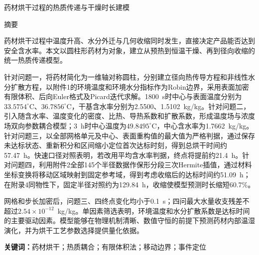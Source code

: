 \documentclass[UTF8,a4paper,zihao=-4,fontset=fandol]{ctexart}
\newcommand{\papertitle}{药材烘干过程的热质传递与干燥时长建模}
\newcommand{\blankcontent}{\par\noindent\strut\par}
\begin{document}

\begin{center}
  {\heiti{}\strut\papertitle\par}
  \vspace{1em}
  {\heiti{}摘要\par}
\end{center}
\hspace*{2em}药材烘干过程中温度升高、水分外迁与几何收缩同时发生，直接决定产品能否达到安全含水率。本文以圆柱形药材为对象，建立从预热到恒温干燥、再到径向收缩的统一热质传递模型。

针对问题一，将药材简化为一维轴对称圆柱，分别建立径向热传导方程和非线性水分扩散方程，以附件1的环境温度和环境水分指标作为Robin边界，采用表面加密有限体积、后向Euler格式及Picard迭代求解。1800~s时中心与表面温度分别为$33.5754^\circ\mathrm C$、$36.7856^\circ\mathrm C$，干基含水率分别为2.5500、1.5102~kg/kg。针对问题二，引入随含水率、温度变化的密度、比热、导热系数和扩散系数，形成温度场与浓度场双向参数耦合模型；3~h时中心温度为$49.8495^\circ\mathrm C$，中心含水率为1.7662~kg/kg。针对问题三，以全部网格单元及中心、表面重构值的最大值为严格判据，通过保存未达标状态、重新积分和区间缩小定位首次达标时刻，得到总烘干时间约57.47~h。快速口径对照表明，若改用平均含水率判据，终点将提前约21.4~h。针对问题四，利用附件2全部145个半径数据作保形分段三次Hermite插值，通过材料坐标变换将移动区域映射到固定参考域，得到考虑收缩后的达标时间约51.09~h；在附录4同物性下，固定半径对照约为129.84~h，收缩使模型预测时长缩短60.7\%。

网格和步长加密后，问题三、四终点变化均小于0.1~s；四问最大水量收支残差不超过$2.54\times10^{-12}$~kg/kg。单因素筛选表明，环境温度和水分扩散系数是达标时间的主要驱动因素。模型能够在物理机制清晰、数值守恒的前提下预测药材内部温湿演化，并为烘干工艺参数选择提供量化依据。
\par\vspace{0.5em}
\noindent\hspace*{2em}\textbf{关键词：}药材烘干；热质耦合；有限体积法；移动边界；事件定位
\par
\clearpage

\end{document}
